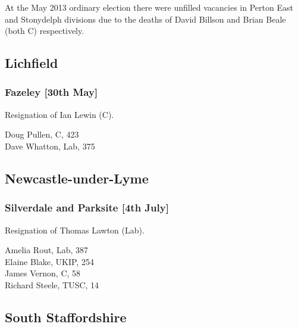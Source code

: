 \documentclass[a4paper,openany,10pt]{book}
\begin{document}
At the May 2013 ordinary election there were unfilled vacancies in Perton East and Stonydelph divisions due to the deaths of David Billson and Brian Beale (both C) respectively.


\subsection*{Lichfield}

\subsubsection*{Fazeley \hspace*{\fill}\nolinebreak[1]%
\enspace\hspace*{\fill}
[30th May]}


Resignation of Ian Lewin (C).



Doug Pullen, C, 423\\
Dave Whatton, Lab, 375\\


\subsection*{Newcastle-under-Lyme}

\subsubsection*{Silverdale and Parksite \hspace*{\fill}\nolinebreak[1]%
\enspace\hspace*{\fill}
[4th July]}


Resignation of Thomas Lawton (Lab).



Amelia Rout, Lab, 387\\
Elaine Blake, UKIP, 254\\
James Vernon, C, 58\\
Richard Steele, TUSC, 14\\


\subsection*{South Staffordshire}
\end{document}
